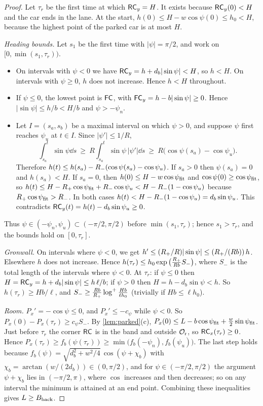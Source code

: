 \begin{proof}
Let $\tau_r$ be the first time at which $\mathsf{RC}_y=H$.
It exists because $\mathsf{RC}_y(0)<H$ and the car ends in the lane.
At the start, $h(0)\le H-w\cos\psi(0)\le h_0<H$, because the highest point of the parked car is at most $H$.

\emph{Heading bounds.}
Let $s_1$ be the first time with $|\psi|=\pi/2$, and work on $[0,\min(s_1,\tau_r))$.
\begin{itemize}[nosep]
\item On intervals with $\psi<0$ we have $\mathsf{RC}_y=h+d_b|\sin\psi|<H$, so $h<H$.
On intervals with $\psi\ge0$, $h$ does not increase.
Hence $h<H$ throughout.
\item If $\psi\le0$, the lowest point is $\mathsf{FC}$, with $\mathsf{FC}_y=h-b|\sin\psi|\ge0$.
Hence $|\sin\psi|\le h/b<H/b$ and $\psi>-\psi_n$.
\item Let $I=(s_a,s_b)$ be a maximal interval on which $\psi>0$, and suppose $\psi$ first reaches $\psi_u$ at $t\in I$.
Since $|\psi'|\le1/R$,
\[
  \int_{s_a}^t\sin\psi\dd s\ \ge\ R\int_{s_a}^t\sin\psi\,|\psi'|\dd s\ \ge\ R\big(\cos\psi(s_a)-\cos\psi_u\big).
\]
Therefore $h(t)\le h(s_a)-R_{-}(\cos\psi(s_a)-\cos\psi_u)$.
If $s_a>0$ then $\psi(s_a)=0$ and $h(s_a)<H$.
If $s_a=0$, then $h(0)\le H-w\cos\psi_{\rm fit}$ and $\cos\psi(0)\ge\cos\psi_{\rm fit}$, so $h(t)\le H-R_{+}\cos\psi_{\rm fit}+R_{-}\cos\psi_u<H-R_{-}(1-\cos\psi_u)$ because $R_{+}\cos\psi_{\rm fit}>R_{-}$.
In both cases $h(t)<H-R_{-}(1-\cos\psi_u)=d_b\sin\psi_u$.
This contradicts $\mathsf{RC}_y(t)=h(t)-d_b\sin\psi_u\ge0$.
\end{itemize}
Thus $\psi\in(-\psi_n,\psi_u)\subset(-\pi/2,\pi/2)$ before $\min(s_1,\tau_r)$; hence $s_1>\tau_r$, and the bounds hold on $[0,\tau_r]$.

\emph{Gronwall.}
On intervals where $\psi<0$, we get $h'\le(R_{+}/R)|\sin\psi|\le(R_{+}/(Rb))\,h$.
Elsewhere $h$ does not increase.
Hence $h(\tau_r)\le h_0\exp\big(\tfrac{R_{+}}{Rb}S_-\big)$, where $S_-$ is the total length of the intervals where $\psi<0$.
At $\tau_r$: if $\psi\le0$ then $H=\mathsf{RC}_y=h+d_b|\sin\psi|\le h\,\ell/b$; if $\psi>0$ then $H=h-d_b\sin\psi<h$.
So $h(\tau_r)\ge Hb/\ell$, and $S_-\ge\frac{Rb}{R_{+}}\log^+\frac{Hb}{\ell h_0}$ (trivially if $Hb\le\ell h_0$).

\emph{Room.}
$P_x'=-\cos\psi\le0$, and $P_x'\le-c_\psi$ while $\psi<0$.
So $P_x(0)-P_x(\tau_r)\ge c_\psi S_-$.
By \cref{lem:parked}(c), $P_x(0)\le L-b\cos\psi_{\rm fit}+\tfrac w2\sin\psi_{\rm fit}$.
Just before $\tau_r$ the corner $\mathsf{RC}$ is in the band and outside $\mathcal{O}_{\mathrm r}$, so $\mathsf{RC}_x(\tau_r)\ge0$.
Hence $P_x(\tau_r)\ge f_b(\psi(\tau_r))\ge\min\big(f_b(-\psi_n),f_b(\psi_u)\big)$.
The last step holds because $f_b(\psi)=\sqrt{d_b^2+w^2/4}\,\cos(\psi+\chi_b)$ with $\chi_b=\arctan(w/(2d_b))\in(0,\pi/2)$, and for $\psi\in(-\pi/2,\pi/2)$ the argument $\psi+\chi_b$ lies in $(-\pi/2,\pi)$, where $\cos$ increases and then decreases; so on any interval the minimum is attained at an end point.
Combining these inequalities gives $L\ge B_{\rm back}$.
\end{proof}

